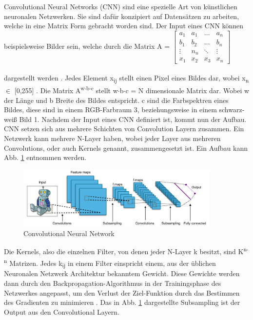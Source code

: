 \documentclass{llncs}
\begin{document}
Convolutional Neural Networks (CNN) sind eine spezielle Art von künstlichen neuronalen Netzwerken. Sie sind dafür konzipiert auf Datensätzen zu arbeiten, welche in eine Matrix Form gebracht worden sind. Der Input eines CNN können beispielsweise Bilder sein, welche durch die Matrix A =
$
\begin{bmatrix}
a_1	& a_1	& \dots	 & a_n     \\
b_1	& b_2 	& \dots  & b_n	  \\
\vdots	& n_n 	& \ddots & \vdots \\
x_1 	& x_2 & x_3	 & x_n
\end{bmatrix}
$
\\\\dargestellt werden \cite{Grundlagen}. Jedes Element x\textsubscript{ij} stellt einen Pixel eines Bildes dar, wobei x\textsubscript{n} $\in$ [0,255] . Die Matrix A\textsuperscript{w$\cdot$b$\cdot$c} stellt w$\cdot$b$\cdot$c = N dimensionale Matrix dar. Wobei w der Länge und b Breite des Bildes entspricht. c sind die Farbspektren eines Bildes, diese sind in einem RGB-Farbraum 3, beziehungsweise in einem schwarz-weiß Bild 1. Nachdem  der Input eines CNN definiert ist, kommt nun der Aufbau. CNN setzen sich aus mehrere Schichten von Convolution Layern zusammen. Ein Netzwerk kann mehrere N-Layer haben, wobei jeder Layer aus mehreren Convolutions, oder auch Kernels genannt, zusammengesetzt ist. Ein Aufbau kann Abb. \ref{fig:Bild10} entnommen werden.
\begin{figure}[htbp] 
	\centering
	\includegraphics[width=0.9\textwidth]{convol.png}
	\caption{Convolutional Neural Network}
	\label{fig:Bild10}
\end{figure}
Die Kernels, also die einzelnen Filter, von denen jeder N-Layer k besitzt, sind K\textsuperscript{n$\cdot$n} Matrizen. Jedes k\textsubscript{ij} in einem Filter einspricht einem, aus der üblichen Neuronalen Netzwerk Architektur bekanntem Gewicht. Diese Gewichte werden dann durch den Backpropagation-Algorithmus in der Trainingsphase des Netzwerkes angepasst, um den Verlust der Ziel-Funktion durch das Bestimmen des Gradienten zu minimieren \cite{Grundlagen}. Das in Abb. \ref{fig:Bild10} dargestellte Subsampling ist der Output aus den Convolutional Layern. 
\end{document}
